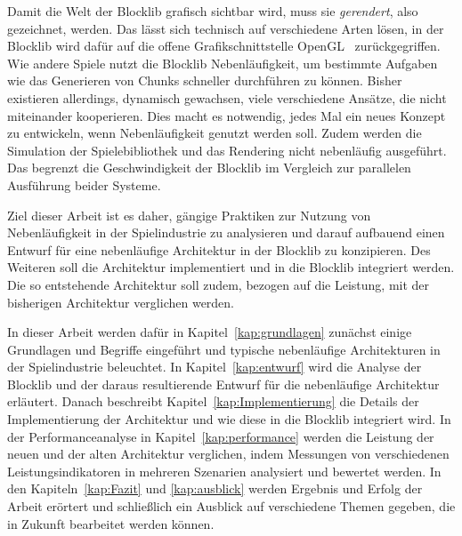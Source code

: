 Damit die Welt der Blocklib grafisch sichtbar wird, muss sie \emph{gerendert}, also gezeichnet, werden. Das lässt sich technisch auf verschiedene Arten lösen, in der Blocklib wird dafür auf die offene Grafikschnittstelle OpenGL~\cite{TheKhronosGroup,Vries2020} zurückgegriffen. Wie andere Spiele nutzt die Blocklib Nebenläufigkeit, um bestimmte Aufgaben wie das Generieren von Chunks schneller durchführen zu können. Bisher existieren allerdings, dynamisch gewachsen, viele verschiedene Ansätze, die nicht miteinander kooperieren. Dies macht es notwendig, jedes Mal ein neues Konzept zu entwickeln, wenn Nebenläufigkeit genutzt werden soll. Zudem werden die Simulation der Spielebibliothek und das Rendering nicht nebenläufig ausgeführt. Das begrenzt die Geschwindigkeit der Blocklib im Vergleich zur parallelen Ausführung beider Systeme.

Ziel dieser Arbeit ist es daher, gängige Praktiken zur Nutzung von Nebenläufigkeit in der Spielindustrie zu analysieren und darauf aufbauend einen Entwurf für eine nebenläufige Architektur in der Blocklib zu konzipieren. Des Weiteren soll die Architektur implementiert und in die Blocklib integriert werden. Die so entstehende Architektur soll zudem, bezogen auf die Leistung, mit der bisherigen Architektur verglichen werden.

In dieser Arbeit werden dafür in Kapitel~\ref{kap:grundlagen} zunächst einige Grundlagen und Begriffe eingeführt und typische nebenläufige Architekturen in der Spielindustrie beleuchtet. In Kapitel~\ref{kap:entwurf} wird die Analyse der Blocklib und der daraus resultierende Entwurf für die nebenläufige Architektur erläutert. Danach beschreibt Kapitel~\ref{kap:Implementierung} die Details der Implementierung der Architektur und wie diese in die Blocklib integriert wird. In der Performanceanalyse in Kapitel~\ref{kap:performance} werden die Leistung der neuen und der alten Architektur verglichen, indem Messungen von verschiedenen Leistungsindikatoren in mehreren Szenarien analysiert und bewertet werden. In den Kapiteln~\ref{kap:Fazit} und \ref{kap:ausblick} werden Ergebnis und Erfolg der Arbeit erörtert und schließlich ein Ausblick auf verschiedene Themen gegeben, die in Zukunft bearbeitet werden können.